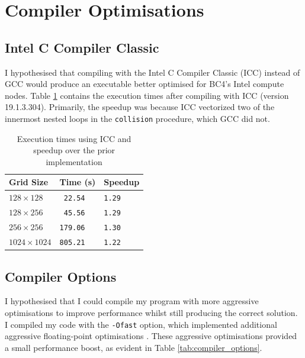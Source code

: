 \documentclass[twocolumn, a4paper]{article}
\begin{document}
\section{Compiler Optimisations}


\subsection{Intel C Compiler Classic}

I hypothesised that compiling with the Intel C Compiler Classic (ICC) instead of GCC would produce an executable better optimised for BC4's Intel compute nodes.
Table \ref{tab:icc} contains the execution times after compiling with ICC (version 19.1.3.304).
Primarily, the speedup was because ICC vectorized two of the innermost nested loops in the \texttt{collision} procedure, which GCC did not. 

\begin{table}[htbp]
  \begin{center}
  \caption{Execution times using ICC and speedup over the prior implementation}\label{tab:icc}
  \begin{tabular}[t]{l | l l} 
      \hline\hline
      Grid Size&Time (s)&Speedup\\
      \hline
      $128 \times 128$&\texttt{ 22.54}&\texttt{1.29}\\
      $128 \times 256$&\texttt{ 45.56}&\texttt{1.29}\\
      $256 \times 256$&\texttt{179.06}&\texttt{1.30}\\
      $1024 \times 1024$&\texttt{805.21}&\texttt{1.22}\\
      \hline
    \end{tabular}
  \end{center}
\end{table}

\subsection{Compiler Options}

I hypothesised that I could compile my program with more aggressive optimisations to improve performance whilst still producing the correct solution.
I compiled my code with the \texttt{-Ofast} option, which implemented additional aggressive floating-point optimisations \cite{icc}.
These aggressive optimisations provided a small performance boost, as evident in Table \ref{tab:compiler_options}.
\end{document}
